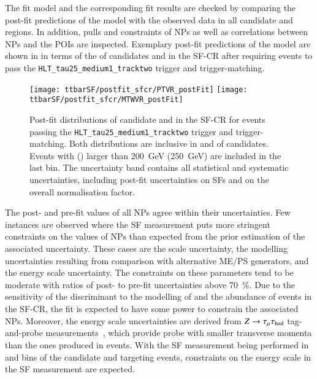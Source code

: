 The fit model and the corresponding fit results are checked by comparing the
post-fit predictions of the model with the observed data in all \tauhadvis
candidate \Ntracks and \pT regions. In addition, pulls and constraints of NPs as
well as correlations between NPs and the POIs are inspected. Exemplary post-fit
predictions of the model are shown in  in terms
of the \pT of \tauhadvis candidates and \mTW in the SF-CR after requiring events
to pass the \texttt{HLT\_tau25\_medium1\_tracktwo} trigger and trigger-matching.

\begin{figure}[htbp]
  \centering

  \texttt{[image: ttbarSF/postfit\_sfcr/PTVR\_postFit]}
  \texttt{[image: ttbarSF/postfit\_sfcr/MTWVR\_postFit]}

  \caption[Post-fit distributions of \tauhadvis candidate \pT and \mTW in the
  SF-CR.]{Post-fit distributions of \tauhadvis candidate \pT and \mTW in the
    SF-CR for events passing the \texttt{HLT\_tau25\_medium1\_tracktwo} trigger
    and trigger-matching. Both distributions are inclusive in \Ntracks and \pT
    of \tauhadvis candidates. Events with \tauhadvis \pT (\mTW) larger than
    \SI{200}{\GeV} (\SI{250}{\GeV}) are included in the last bin. The
    uncertainty band contains all statistical and systematic uncertainties,
    including post-fit uncertainties on \faketauhadvis SFs and on the overall
    \ttbar normalisation factor.}%
  \label{fig:ttbarSF_postfit_ptmtw}
\end{figure}

The post- and pre-fit values of all NPs agree within their
uncertainties. Few instances are observed where the SF measurement puts more
stringent constraints on the values of NPs than expected from
the prior estimation of the associated uncertainty. These cases are the
\pTmissAbs scale uncertainty, the \ttbar modelling uncertainties resulting from
comparison with alternative ME/PS generators, and the \tauhadvis energy scale
uncertainty. The constraints on these parameters tend to be moderate with ratios
of post- to pre-fit uncertainties above \SI{70}{\percent}. Due to the
sensitivity of the \mTW discriminant to the modelling of \pTmissAbs and the
abundance of \ttbar events in the SF-CR, the fit is expected to have some power
to constrain the associated NPs. Moreover, the \tauhadvis energy
scale uncertainties are derived from $Z \rightarrow \tau_{\mu} \tau_{\text{had}}$ tag-and-probe
measurements~\cite{ATLAS-CONF-2017-029}, which provide probe \tauhadvis with
smaller transverse momenta than the ones produced in \ttbar events. With the SF
measurement being performed in \Ntracks and \pT bins of the \tauhadvis candidate
and targeting \ttbar events, constraints on the \tauhadvis energy scale in the
SF measurement are expected.

